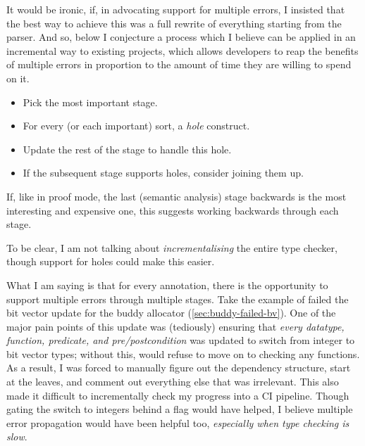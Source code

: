 It would be ironic, if, in advocating support for multiple errors, I insisted
that the best way to achieve this was a full rewrite of everything starting
from the parser. And so, below I conjecture a process which I believe can be
applied in an incremental way to existing projects, which allows developers
to reap the benefits of multiple errors in proportion to the amount of
time they are willing to spend on it.
\begin{itemize}
    \item Pick the most important stage.
    \item For every (or each important) sort, a \emph{hole}
        construct.~
    \item Update the rest of the stage to handle this hole.
    \item If the subsequent stage supports holes, consider joining them up.
\end{itemize}
If, like in  proof mode, the last (semantic analysis) stage backwards is
the most interesting and expensive one, this suggests working backwards through
each stage.

To be clear, I am not talking about \emph{incrementalising} the entire type
checker, though support for holes could make this easier.

What I am saying is that for every  annotation, there is the opportunity
to support multiple errors through multiple stages. Take the example of failed
the bit vector update for the buddy allocator (\cref{sec:buddy-failed-bv}). One
of the major pain points of this update was (tediously) ensuring that
\emph{every datatype, function, predicate, and pre/postcondition} was updated
to switch from integer to bit vector types; without this,  would refuse
to move on to checking any functions. As a result, I was forced to manually
figure out the dependency structure, start at the leaves, and comment out
everything else that was irrelevant. This also made it difficult to
incrementally check my progress into a CI pipeline. Though gating the switch to
integers behind a flag would have helped, I believe multiple error propagation
would have been helpful too, \emph{especially when type checking is slow}.

